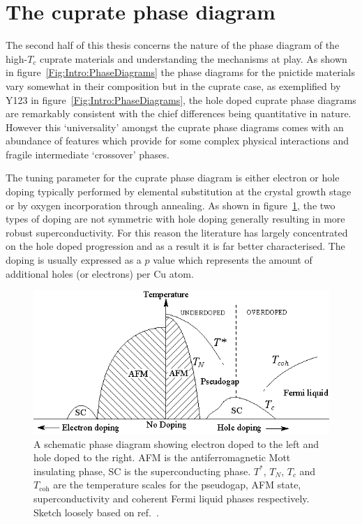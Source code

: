 
\section{The cuprate phase diagram}
    \label{Sec:Intro:PhaseDiagram}

The second half of this thesis concerns the nature of the phase diagram of the high-$T_c$ cuprate materials and understanding the mechanisms at play. As shown in figure~\ref{Fig:Intro:PhaseDiagrams} the phase diagrams for the pnictide materials vary somewhat in their composition but in the cuprate case, as exemplified by \ac{Y123} in figure~\ref{Fig:Intro:PhaseDiagrams}, the hole doped cuprate phase diagrams are remarkably consistent with the chief differences being quantitative in nature. However this `universality' amongst the cuprate phase diagrams comes with an abundance of features which provide for some complex physical interactions and fragile intermediate `crossover' phases. 

The tuning parameter for the cuprate phase diagram is either electron or hole doping typically performed by elemental substitution at the crystal growth stage or by oxygen incorporation through annealing. As shown in figure~\ref{Fig:Intro:ElecHolePhaseDiagram}, the two types of doping are not symmetric with hole doping generally resulting in more robust superconductivity. For this reason the literature has largely concentrated on the hole doped progression and as a result it is far better characterised. The doping is usually expressed as a $p$ value which represents the amount of additional holes (or electrons) per Cu atom.
\begin{figure}[htbp]
    \begin{center}
        \includegraphics[scale=1.4]{Chapter-Introduction/Figures/ElecHolePhaseDiagram/ElecHolePhaseDiagram}
        \caption{A schematic phase diagram showing electron doped to the left and hole doped to the right. \ac{AFM} is the antiferromagnetic Mott insulating phase, SC is the superconducting phase. $T^*$, $T_N$, $T_c$ and $T_{\textrm{coh}}$ are the temperature scales for the pseudogap, \ac{AFM} state, superconductivity and coherent Fermi liquid phases respectively. Sketch loosely based on ref.~\cite{Orenstein2010}.}
        \label{Fig:Intro:ElecHolePhaseDiagram}
    \end{center}
\end{figure}

